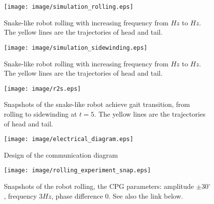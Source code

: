 \documentclass[letterpaper, 10 pt, conference]{ieeeconf}
\begin{document}
\begin{figure}[th]
\centering
    \texttt{[image: image/simulation\_rolling.eps]}
    \caption{Snake-like robot rolling with increasing frequency from $Hz$ to $Hz$. The yellow lines are the trajectories of head and tail.}
    \label{simulation_rolling}
\end{figure}

\begin{figure}[th]
    \centering
    \texttt{[image: image/simulation\_sidewinding.eps]}
    \caption{Snake-like robot rolling with increasing frequency from $Hz$ to $Hz$. The yellow lines are the trajectories of head and tail.}
    \label{simulation_sidewinding}
\end{figure}

\begin{figure*}[th]
\centering
\texttt{[image: image/r2s.eps]}
\caption{Snapshots of the snake-like robot achieve gait transition, from rolling to sidewinding at $t=5$. The yellow lines are the trajectories of head and tail. }
\label{r2s_snap}
\end{figure*}

\begin{figure*}[th]
\centering
\texttt{[image: image/electrical\_diagram.eps]}
\caption{Design of the communication diagram}
\label{electrical_diagram}
\end{figure*}

%

\begin{figure*}[th]
\centering
\texttt{[image: image/rolling\_experiment\_snap.eps]}
\caption{Snapshots of the robot rolling, the CPG parameters: amplitude $\pm30^{\circ}$, frequency $3Hz$, phase difference $0$. See also the link below.}
\label{rolling_experiment_snap.eps}
\end{figure*}
\end{document}
